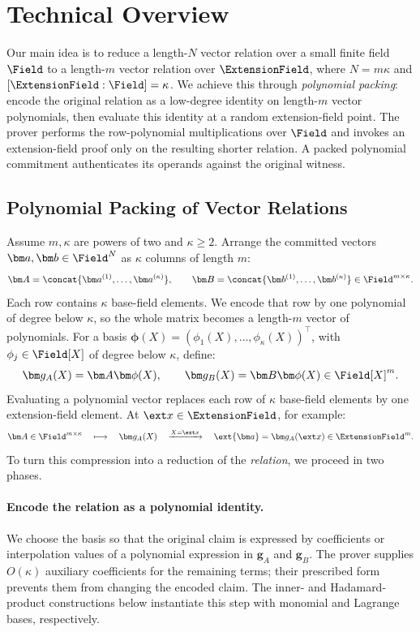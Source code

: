 \section{Technical Overview}
\label{sec:overview}

Our main idea is to reduce a length-\(N\) vector relation over a small
finite field \(\Field\) to a length-\(m\) vector relation over
\(\ExtensionField\), where \(N=m\kappa\) and
\([\ExtensionField:\Field]=\kappa\).
We achieve this through \emph{polynomial packing}: encode the original
relation as a low-degree identity on length-\(m\) vector polynomials,
then evaluate this identity at a random extension-field point.
The prover performs the row-polynomial multiplications over \(\Field\)
and invokes an extension-field proof only on the resulting shorter
relation. A packed polynomial commitment authenticates its operands
against the original witness.

\subsection{Polynomial Packing of Vector Relations}
\label{sec:dualPhase}

Assume \(m,\kappa\) are powers of two and \(\kappa\geq2\).
Arrange the committed vectors \(\bm a,\bm b\in\Field^N\) as
\(\kappa\) columns of length \(m\):
\[
    \bm A=\concat{\bm a^{(1)},\ldots,\bm a^{(\kappa)}},
    \qquad
    \bm B=\concat{\bm b^{(1)},\ldots,\bm b^{(\kappa)}}
    \in\Field^{m\times\kappa}.
\]
Each row contains \(\kappa\) base-field elements. We encode that row
by one polynomial of degree below \(\kappa\), so the whole matrix
becomes a length-\(m\) vector of polynomials.
For a basis
\(\bm\phi(X)=(\phi_1(X),\ldots,\phi_\kappa(X))^\top\), with
\(\phi_j\in\Field[X]\) of degree below \(\kappa\), define:
\begin{equation}
    \bm g_A(X)=\bm A\bm\phi(X),
    \qquad
    \bm g_B(X)=\bm B\bm\phi(X)
    \in\Field[X]^m.
\label{eq:overview-packing}
\end{equation}
Evaluating a polynomial vector replaces each row of \(\kappa\)
base-field elements by one extension-field element.
At \(\ext x\in\ExtensionField\), for example:
\[
    \bm A\in\Field^{m\times\kappa}
    \quad\longmapsto\quad
    \bm g_A(X)
    \quad\xrightarrow{X=\ext x}\quad
    \ext{\bm a}=\bm g_A(\ext x)\in\ExtensionField^m.
\]
To turn this compression into a reduction of the \emph{relation},
we proceed in two phases.

\paragraph{Encode the relation as a polynomial identity.}
We choose the basis so that the original claim is expressed by
coefficients or interpolation values of a polynomial expression in
\(\bm g_A\) and \(\bm g_B\).
The prover supplies \(O(\kappa)\) auxiliary coefficients for the
remaining terms; their prescribed form prevents them from changing
the encoded claim.
The inner- and Hadamard-product constructions below instantiate this
step with monomial and Lagrange bases, respectively.


